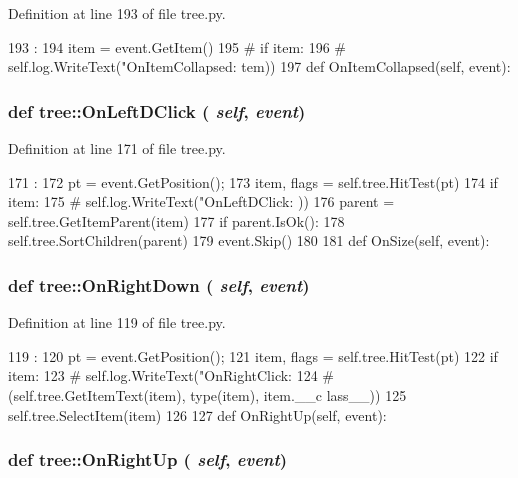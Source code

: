 Definition at line 193 of file tree.py.


\begin{DoxyCode}
193                                    :
194         item = event.GetItem()
195 #        if item:
196 #            self.log.WriteText("OnItemCollapsed: %
      tem))
197 
    def OnItemCollapsed(self, event):
\end{DoxyCode}
\hypertarget{namespacetree_a93fd5476fb09c688237ea3ff343f085c}{
\subsubsection[{OnLeftDClick}]{\setlength{\rightskip}{0pt plus 5cm}def tree::OnLeftDClick ( {\em self}, \/   {\em event})}}
\label{namespacetree_a93fd5476fb09c688237ea3ff343f085c}


Definition at line 171 of file tree.py.


\begin{DoxyCode}
171                                  :
172         pt = event.GetPosition();
173         item, flags = self.tree.HitTest(pt)
174         if item:
175 #            self.log.WriteText("OnLeftDClick: %
      ))
176             parent = self.tree.GetItemParent(item)
177             if parent.IsOk():
178                 self.tree.SortChildren(parent)
179         event.Skip()
180 
181 
    def OnSize(self, event):
\end{DoxyCode}
\hypertarget{namespacetree_aa00c842d573e5552c662b5fd1fa1c26a}{
\subsubsection[{OnRightDown}]{\setlength{\rightskip}{0pt plus 5cm}def tree::OnRightDown ( {\em self}, \/   {\em event})}}
\label{namespacetree_aa00c842d573e5552c662b5fd1fa1c26a}


Definition at line 119 of file tree.py.


\begin{DoxyCode}
119                                 :
120         pt = event.GetPosition();
121         item, flags = self.tree.HitTest(pt)
122         if item:
123 #            self.log.WriteText("OnRightClick: %
124 #                              (self.tree.GetItemText(item), type(item), item.__c
      lass__))
125             self.tree.SelectItem(item)
126 
127 
    def OnRightUp(self, event):
\end{DoxyCode}
\hypertarget{namespacetree_a5e44cc3fad7655cdd568c2276f4391a2}{
\subsubsection[{OnRightUp}]{\setlength{\rightskip}{0pt plus 5cm}def tree::OnRightUp ( {\em self}, \/   {\em event})}}
\label{namespacetree_a5e44cc3fad7655cdd568c2276f4391a2}


